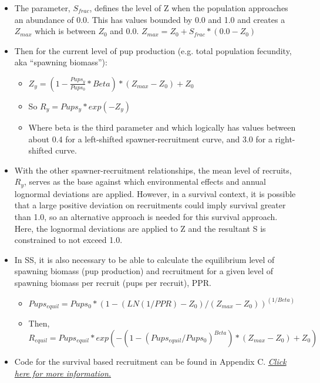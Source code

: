 \begin{description}
\begin{itemize}
		\item The parameter, $S_{frac}$, defines the level of Z when the population approaches an abundance of 0.0.  This has values bounded by 0.0 and 1.0 and creates a $Z_{max}$ which is between $Z_0$ and 0.0. $Z_{max} = Z_0 + S_{frac}*(0.0-Z_0)$
		\item Then for the current level of pup production (e.g. total population fecundity, aka “spawning biomass”):
		\begin{itemize}
			\item $Z_y=(1 - \frac{Pups_y}{Pups_0}*Beta)*(Z_{max}-Z_0)+Z_0$
			\item So $R_y = Pups_y * exp(-Z_y)$
			\item Where beta is the third parameter and which logically has values between about 0.4 for a left-shifted spawner-recruitment curve, and 3.0 for a right-shifted curve.
		\end{itemize}
		\item With the other spawner-recruitment relationships, the mean level of recruits, $R_y$, serves as the base against which environmental effects and annual lognormal deviations are applied.  However, in a survival context, it is possible that a large positive deviation on recruitments could imply survival greater than 1.0, so an alternative approach is needed for this survival approach.  Here, the lognormal deviations are applied to Z and the resultant S is constrained to not exceed 1.0.
		\item In SS, it is also necessary to be able to calculate the equilibrium level of spawning biomass (pup production) and recruitment for a given level of spawning biomass per recruit (pups per recruit), PPR.
		\begin{itemize}
			\item $Pups_{equil} = Pups_0 * (1 - (LN(1/PPR) - Z_0)/(Z_{max} - Z_0))^{(1/Beta)} $
			\item Then, $R_{equil} = Pups_{equil} * exp(-(1 - (Pups_{equil}/Pups_0)^{Beta})*(Z_{max}-Z_0)+Z_0)$
		\end{itemize}
		\item Code for the survival based recruitment can be found in Appendix C. \hyperlink{AppendixC}{\textit{Click here for more information.}}
	\end{itemize}



\end{description}
